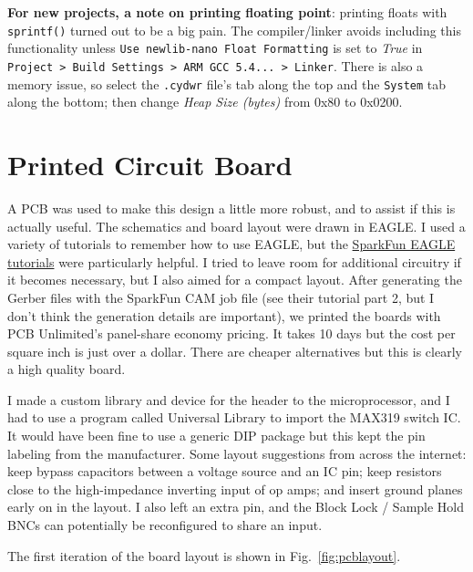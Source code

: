 \documentclass[10pt]{report}
\begin{document}
\textbf{For new projects, a note on printing floating point}: printing floats with \texttt{sprintf()} turned out to be a big pain. The compiler/linker avoids including this functionality unless \texttt{Use newlib-nano Float Formatting} is set to \textit{True} in \texttt{Project > Build Settings > ARM GCC 5.4... > Linker}. There is also a memory issue, so select the \texttt{.cydwr} file's tab along the top and the \texttt{System} tab along the bottom; then change \textit{Heap Size (bytes)} from 0x80 to 0x0200.




\chapter{Printed Circuit Board}\label{chap:pcb}

A PCB was used to make this design a little more robust, and to assist if this is actually useful. The schematics and board layout were drawn in EAGLE. I used a variety of tutorials to remember how to use EAGLE, but the \href{https://learn.sparkfun.com/tutorials/using-eagle-schematic}{SparkFun EAGLE tutorials} were particularly helpful. I tried to leave room for additional circuitry if it becomes necessary, but I also aimed for a compact layout. After generating the Gerber files with the SparkFun CAM job file (see their tutorial part 2, but I don't think the generation details are important), we printed the boards with PCB Unlimited's panel-share economy pricing. It takes 10 days but the cost per square inch is just over a dollar. There are cheaper alternatives but this is clearly a high quality board.

I made a custom library and device for the header to the microprocessor, and I had to use a program called Universal Library to import the MAX319 switch IC. It would have been fine to use a generic DIP package but this kept the pin labeling from the manufacturer. Some layout suggestions from across the internet: keep bypass capacitors between a voltage source and an IC pin; keep resistors close to the high-impedance inverting input of op amps; and insert ground planes early on in the layout. I also left an extra pin, and the Block Lock / Sample Hold BNCs can potentially be reconfigured to share an input.

The first iteration of the board layout is shown in Fig.~\ref{fig:pcblayout}.
\end{document}
